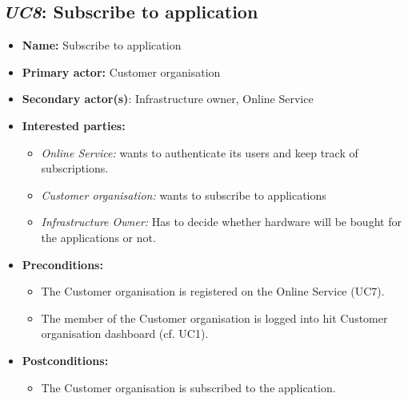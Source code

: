 \documentclass[english]{sareport}
\begin{document}
\subsection{\emph{UC8}: Subscribe to application}
\begin{itemize}
    \item \textbf{Name:} Subscribe to application
    \item \textbf{Primary actor:} Customer organisation
    \item \textbf{Secondary actor(s)}: Infrastructure owner, Online Service
    \item \textbf{Interested parties:} 
        \begin{itemize}
            \item \textit{Online Service:} wants to authenticate its users and keep track of subscriptions.
            \item \textit{Customer organisation:} wants to subscribe to applications
            \item \textit{Infrastructure Owner:} Has to decide whether hardware will be bought for the applications or not.
        \end{itemize}

    \item \textbf{Preconditions:}
        \begin{itemize}
            \item The Customer organisation is registered on the Online Service (UC7).
            \item The member of the Customer organisation is logged into hit Customer organisation dashboard (cf. UC1).
        \end{itemize}

    \item \textbf{Postconditions:}
        \begin{itemize}
            \item The Customer organisation is subscribed to the application.

        \end{itemize}


\end{itemize}
\end{document}

